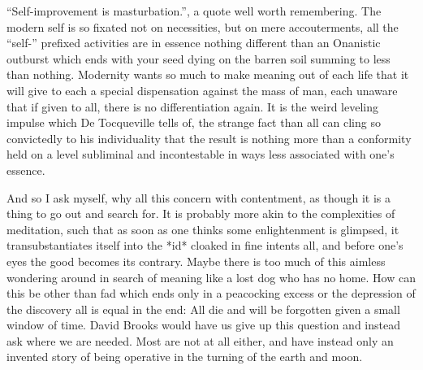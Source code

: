 \documentclass[ebook, 10pt, openright, onecolumn]{memoir}
\newcommand*\td[1]{
  \todo[inline]{
     #1 
  }
}
\newcommand*\finish{\td{ ----- Finish this section -----}}
\begin{document}
\finish{}

``Self-improvement is masturbation.'', a quote well worth remembering.  The
modern self is so fixated not on necessities, but on mere accouterments, all the
``self-'' prefixed activities are in essence nothing different than an Onanistic
outburst which ends with your seed dying on the barren soil summing to less than
nothing.  Modernity wants so much to make meaning out of each life that it will
give to each a special dispensation against the mass of man, each unaware that
if given to all, there is no differentiation again.  It is the weird leveling
impulse which De Tocqueville tells of, the strange fact than all can cling so
convictedly to his individuality that the result is nothing more than a
conformity held on a level subliminal and incontestable in ways less associated
with one's essence.

And so I ask myself, why all this concern with contentment, as though it is a
thing to go out and search for.  It is probably more akin to the complexities of
meditation, such that as soon as one thinks some enlightenment is glimpsed, it
transubstantiates itself into the *id* cloaked in fine intents all, and before
one's eyes the good becomes its contrary.  Maybe there is too much of this
aimless wondering around in search of meaning like a lost dog who has no home.
How can this be other than fad which ends only in a peacocking excess or the
depression of the discovery all is equal in the end: All die and will be
forgotten given a small window of time.  David Brooks would have us give up this
question and instead ask where we are needed.  Most are not at all either, and
have instead only an invented story of being operative in the turning of the
earth and moon. 
\end{document}

